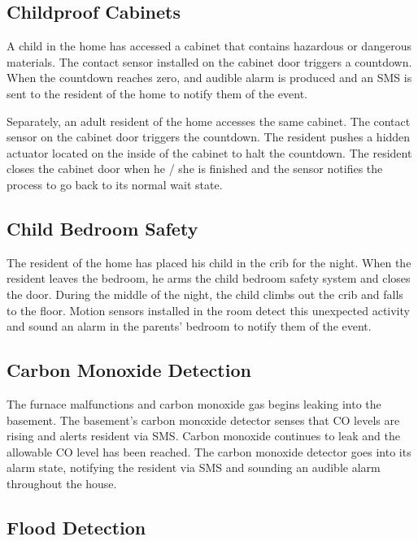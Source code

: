 \documentclass{report}
\begin{document}
\subsection*{Childproof Cabinets}

A child in the home has accessed a cabinet that contains hazardous or dangerous
materials. The contact sensor installed on the cabinet door triggers a
countdown. When the countdown reaches zero, and audible alarm is produced and
an SMS is sent to the resident of the home to notify them of the event.

Separately, an adult resident of the home accesses the same cabinet. The
contact sensor on the cabinet door triggers the countdown. The resident pushes
a hidden actuator located on the inside of the cabinet to halt the countdown.
The resident closes the cabinet door when he / she is finished and the sensor
notifies the process to go back to its normal wait state.

\subsection*{Child Bedroom Safety}

The resident of the home has placed his child in the crib for the night. When
the resident leaves the bedroom, he arms the child bedroom safety system and
closes the door. During the middle of the night, the child climbs out the crib
and falls to the floor. Motion sensors installed in the room detect this
unexpected activity and sound an alarm in the parents' bedroom to notify them
of the event.

\subsection*{Carbon Monoxide Detection}

The furnace malfunctions and carbon monoxide gas begins leaking into the
basement.  The basement's carbon monoxide detector senses that CO levels are
rising and alerts resident via SMS. Carbon monoxide continues to leak and the
allowable CO level has been reached. The carbon monoxide detector goes into its
alarm state, notifying the resident via SMS and sounding an audible alarm
throughout the house.

\subsection*{Flood Detection}
\end{document}
